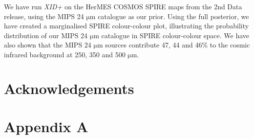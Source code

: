 \documentclass[useAMS,usenatbib]{mnras}
\begin{document}
We have run \emph{XID+} on the HerMES COSMOS SPIRE maps from the 2nd Data release, using the MIPS 24 $\mathrm{\mu m}$ catalogue \citep{LeFLoch:2009} as our prior. Using the full posterior, we have created a marginalised SPIRE colour-colour plot, illustrating the probability distribution of our MIPS 24 $\mathrm{\mu m}$ catalogue in SPIRE colour-colour space. We have also shown that the MIPS 24 $\mathrm{\mu m}$ sources contribute 47, 44 and 46\%  to the cosmic infrared background at 250, 350 and 500 $\mathrm{\mu m}$.  

 

\section*{Acknowledgements}%
%
%
%

\appendix
\section*{Appendix A}\label{Stan_model}
\onecolumn

%
%
%
%
%
%
%
\end{document}

